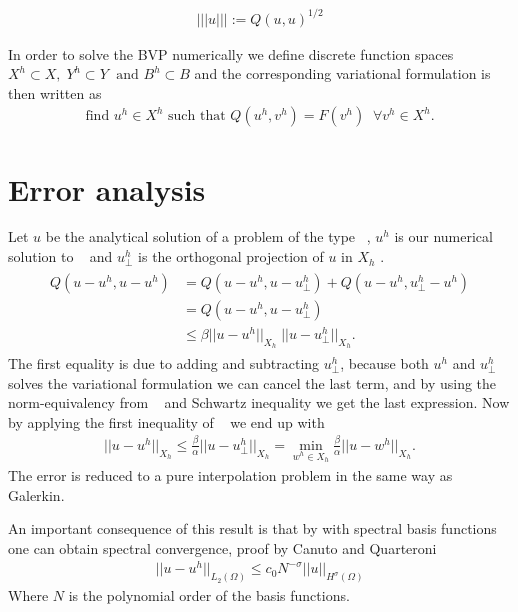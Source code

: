 \begin{align}
	||| u ||| := Q(u,u)^{1/2}
	\label{eq:energynorm}
\end{align}

In order to solve the BVP numerically we define discrete function spaces $X^h \subset X, \; Y^h\subset Y \; \text{ and } B^h \subset B $ and the corresponding variational formulation is then written as 
\begin{align}
	\text{find } u^h \in X^h \text{  such that  } Q(u^h,v^h) = F(v^h) \; \; \forall v^h\in X^h.
	\label{eq:varFormGenDisc}
\end{align}
%
\section{Error analysis}
Let $u$ be the analytical solution of a problem of the type ~, $u^h$ is our numerical solution to ~ and $u^h_{\perp} $ is the orthogonal projection of $u$ in $X_h$ \cite{bochev1998}. 
\begin{align}
	\begin{split}
	Q(u-u^h,u-u^h) &= Q(u-u^h,u-u^h_{\perp}) + Q(u-u^h,u^h_{\perp}-u^h) \\
							   &= Q(u-u^h,u-u^h_{\perp}) \\
							 	 &\leq \beta ||u-u^h||_{X_h} \; ||u-u^h_{\perp}||_{X_h}.
	\end{split}
	\label{eq:error1}
\end{align}
The first equality is due to adding and subtracting $u^h_{\perp}$, because both $u^h$ and $u^h_{\perp}$ solves the variational formulation we can cancel the last term, and by using the norm-equivalency from ~ and Schwartz inequality we get the last  expression. Now by applying the first inequality of ~ we end up with 
\begin{align}
	||u-u^h||_{X_h}\leq \frac{\beta}{\alpha}||u-u^h_{\perp}||_{X_h} = \min_{w^h \in X_h}\frac{\beta}{\alpha}||u-w^h||_{X_h}.
	\label{error_final}
\end{align}
The error is reduced to a pure interpolation problem in the same way as Galerkin. 

An important consequence of this result is that by with spectral basis functions one can obtain spectral convergence, proof by Canuto and Quarteroni \cite{Canuto}
\begin{align}
	||u-u^h||_{L_2(\Omega)} \leq c_0N^{-\sigma}||u||_{H^{\sigma}(\Omega)}
	\label{eq:spectralConvergence}
\end{align}
Where $N$ is the polynomial order of the basis functions.
%

